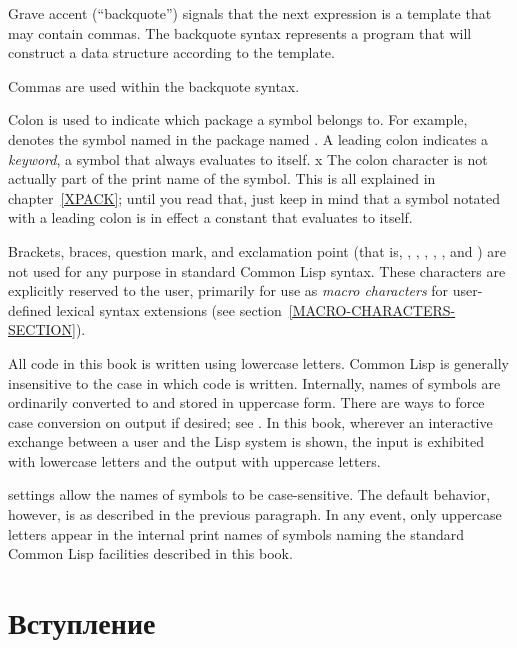 \begin{indentdesc}{1.2pc}
\item[\cd{{\Xbq}}] Grave accent (``backquote'') signals that
the next expression is a template that may contain commas.  The backquote syntax
represents a program that will construct a data structure
according to the template.

\item[\cd{,}] Commas are used within the backquote syntax.

\item[\cd{:}] Colon is used to indicate which package a
symbol belongs to. For example,  denotes the symbol named
 in the package named .  A leading colon indicates a
\emph{keyword}, a symbol that always evaluates to itself. x
The colon character is not actually part of the print name
of the symbol.
This is all explained in chapter~\ref{XPACK}; until you read
that, just keep in mind that a symbol notated with a leading colon
is in effect a constant that evaluates to itself.
\end{indentdesc}

Brackets, braces, question mark, and exclamation point
(that is, \cd{{\Xlbracket}}, \cd{{\Xrbracket}}, \cd{{\Xlbrace}}, \cd{{\Xrbrace}},
, and \cd{!}) are not used for any purpose in standard Common Lisp syntax.
These characters are explicitly reserved to the user, primarily
for use as \emph{macro characters} for user-defined lexical syntax extensions
(see section~\ref{MACRO-CHARACTERS-SECTION}).

All code in this book is written using lowercase letters.
Common Lisp is generally insensitive to the case in which code
is written.  Internally, names of symbols are ordinarily
converted to and stored in uppercase form.
There are ways to force case conversion on output if desired;
see .
In this book, wherever an interactive exchange between a user
and the Lisp system is shown, the input is exhibited with lowercase
letters and the output with uppercase letters.

 settings allow the names of symbols
to be case-sensitive.  The default behavior, however, is as described
in the previous paragraph.  In any event, only uppercase letters
appear in the internal print names of symbols naming the
standard Common Lisp facilities described in this book.

\else

\chapter{Вступление}

